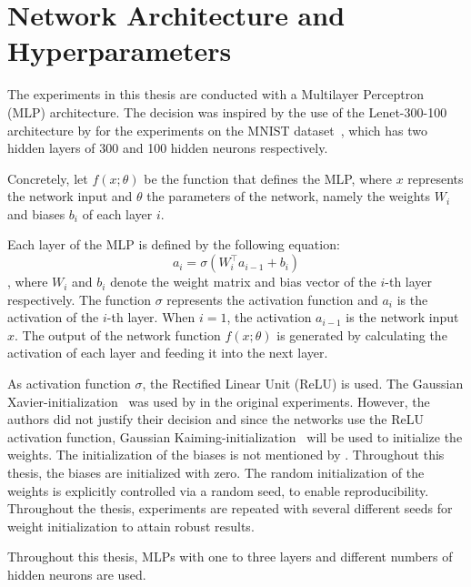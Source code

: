 


\section{Network Architecture and Hyperparameters}
The experiments in this thesis are conducted with a Multilayer Perceptron (MLP) architecture.
The decision was inspired by the use of the Lenet-300-100~\autocite{LeCun} architecture by \textcite{LTH} for the experiments on the MNIST dataset~\autocite{mnist}, which has two hidden layers of 300 and 100 hidden neurons respectively.

Concretely, let $f(x; \theta)$ be the function that defines the MLP, where $x$ represents the network input and $\theta$ the parameters of the network, namely the weights $W_i$ and biases $b_i$ of each layer $i$.

Each layer of the MLP is defined by the following equation:
\[
a_i = \sigma(W_i^\top a_{i-1} + b_{i})
\]
, where $W_i$ and $b_i$ denote the weight matrix and bias vector of the $i$-th layer respectively.
The function $\sigma$ represents the activation function and $a_i$ is the activation of the $i$-th layer.
When $i=1$, the activation $a_{i-1}$ is the network input $x$.
The output of the network function $f(x; \theta)$ is generated by calculating the activation of each layer and feeding it into the next layer.

As activation function $\sigma$, the Rectified Linear Unit (ReLU) is used.
The Gaussian Xavier-initialization~\autocite{XAVIER-GLOROT} was used by \textcite{LTH} in the original experiments.
However, the authors did not justify their decision and since the networks use the ReLU activation function, Gaussian Kaiming-initialization~\autocite{KAIMING-HE} will be used to initialize the weights.
The initialization of the biases is not mentioned by \textcite{LTH}.
Throughout this thesis, the biases are initialized with zero.
The random initialization of the weights is explicitly controlled via a random seed, to enable reproducibility.
Throughout the thesis, experiments are repeated with several different seeds for weight initialization to attain robust results.

Throughout this thesis, MLPs with one to three layers and different numbers of hidden neurons are used.




